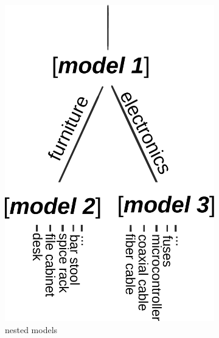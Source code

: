 \begin{figure}
    \centering
    \begin{subfigure}[t]{0.55\columnwidth}
        \centering
        \includegraphics[width=\textwidth]{img/nested}
        \caption{nested models}
    \end{subfigure}%
    ~~~~~
    \begin{subfigure}[t]{0.40\columnwidth}
        \centering

\end{subfigure}
\end{figure}
